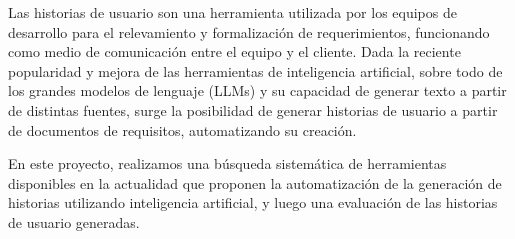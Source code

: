 

Las historias de usuario son una herramienta utilizada por los equipos de desarrollo para el relevamiento y formalización de requerimientos, funcionando como medio de comunicación entre el equipo y el cliente. Dada la reciente popularidad y mejora de las herramientas de inteligencia artificial, sobre todo de los grandes modelos de lenguaje (LLMs) y su capacidad de generar texto a partir de distintas fuentes, surge la posibilidad de generar historias de usuario a partir de documentos de requisitos, automatizando su creación.

En este proyecto, realizamos una búsqueda sistemática de herramientas disponibles en la actualidad que proponen la automatización de la generación de historias utilizando inteligencia artificial, y luego una evaluación de las historias de usuario generadas.

\hfill \break
{}